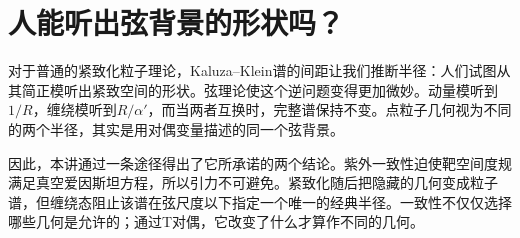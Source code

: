 \begin{classroomqa}
\end{classroomqa}

\section{人能听出弦背景的形状吗？}

对于普通的紧致化粒子理论，Kaluza--Klein谱的间距让我们推断半径：人们试图从其简正模听出紧致空间的形状。弦理论使这个逆问题变得更加微妙。动量模听到\(1/R\)，缠绕模听到\(R/\alpha'\)，而当两者互换时，完整谱保持不变。点粒子几何视为不同的两个半径，其实是用对偶变量描述的同一个弦背景。

因此，本讲通过一条途径得出了它所承诺的两个结论。紫外一致性迫使靶空间度规满足真空爱因斯坦方程，所以引力不可避免。紧致化随后把隐藏的几何变成粒子谱，但缠绕态阻止该谱在弦尺度以下指定一个唯一的经典半径。一致性不仅仅选择哪些几何是允许的；通过T对偶，它改变了什么才算作不同的几何。
